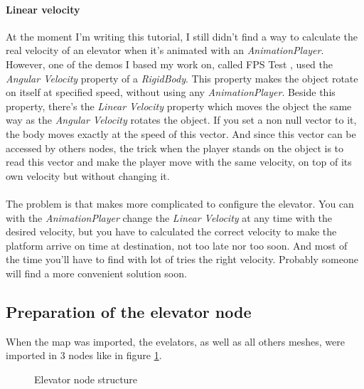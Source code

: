 \documentclass[10pt,a4paper]{article}
\begin{document}
\paragraph{Linear velocity}
At the moment I'm writing this tutorial, I still didn't find a way to calculate the real velocity of an elevator when it's animated with an \textit{AnimationPlayer}. However, one of the demos I based my work on, called FPS Test \cite{FPSTest}, used the \textit{Angular Velocity} property of a \textit{RigidBody}. This property makes the object rotate on itself at specified speed, without using any \textit{AnimationPlayer}. Beside this property, there's the \textit{Linear Velocity} property which moves the object the same way as the \textit{Angular Velocity} rotates the object. If you set a non null vector to it, the body moves exactly at the speed of this vector. And since this vector can be accessed by others nodes, the trick when the player stands on the object is to read this vector and make the player move with the same velocity, on top of its own velocity but without changing it.\\
\\
The problem is that makes more complicated to configure the elevator. You can with the \textit{AnimationPlayer} change the \textit{Linear Velocity} at any time with the desired velocity, but you have to calculated the correct velocity to make the platform arrive on time at destination, not too late nor too soon. And most of the time you'll have to find with lot of tries the right velocity. Probably someone will find a more convenient solution soon.

\subsection{Preparation of the elevator node}
When the map was imported, the evelators, as well as all others meshes, were imported in 3 nodes like in figure \ref{fig:col_node_structure}.

\begin{figure}[H]
\centering
{}
\caption{Elevator node structure}
\label{fig:col_node_structure}
\end{figure}
\end{document}

